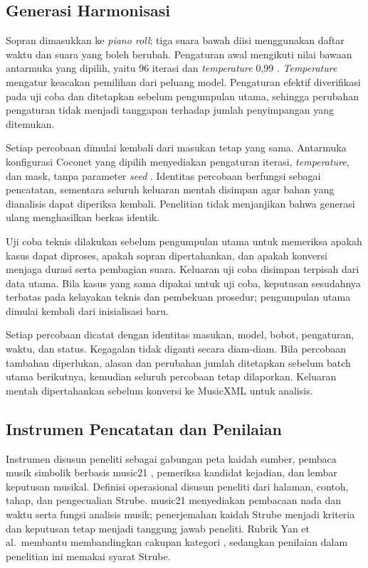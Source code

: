 \subsection{Generasi Harmonisasi}\label{sec:generasi-harmonisasi}

Sopran dimasukkan ke \textit{piano roll}; tiga suara bawah diisi menggunakan daftar waktu dan suara yang boleh berubah. Pengaturan awal mengikuti nilai bawaan antarmuka yang dipilih, yaitu 96 iterasi dan \textit{temperature} 0,99 \parencite{magentacoconet}. \textit{Temperature} mengatur keacakan pemilihan dari peluang model. Pengaturan efektif diverifikasi pada uji coba dan ditetapkan sebelum pengumpulan utama, sehingga perubahan pengaturan tidak menjadi tanggapan terhadap jumlah penyimpangan yang ditemukan.

Setiap percobaan dimulai kembali dari masukan tetap yang sama. Antarmuka konfigurasi Coconet yang dipilih menyediakan pengaturan iterasi, \textit{temperature}, dan mask, tanpa parameter \textit{seed} \parencite{magentacoconet}. Identitas percobaan berfungsi sebagai pencatatan, sementara seluruh keluaran mentah disimpan agar bahan yang dianalisis dapat diperiksa kembali. Penelitian tidak menjanjikan bahwa generasi ulang menghasilkan berkas identik.

Uji coba teknis dilakukan sebelum pengumpulan utama untuk memeriksa apakah kasus dapat diproses, apakah sopran dipertahankan, dan apakah konversi menjaga durasi serta pembagian suara. Keluaran uji coba disimpan terpisah dari data utama. Bila kasus yang sama dipakai untuk uji coba, keputusan sesudahnya terbatas pada kelayakan teknis dan pembekuan prosedur; pengumpulan utama dimulai kembali dari inisialisasi baru.

Setiap percobaan dicatat dengan identitas masukan, model, bobot, pengaturan, waktu, dan status. Kegagalan tidak diganti secara diam-diam. Bila percobaan tambahan diperlukan, alasan dan perubahan jumlah ditetapkan sebelum batch utama berikutnya, kemudian seluruh percobaan tetap dilaporkan. Keluaran mentah dipertahankan sebelum konversi ke MusicXML untuk analisis.

\subsection{Instrumen Pencatatan dan Penilaian}\label{sec:instrumen-pengukuran}

Instrumen disusun peneliti sebagai gabungan peta kaidah sumber, pembaca musik simbolik berbasis music21 \parencite{cuthbert2010}, pemeriksa kandidat kejadian, dan lembar keputusan musikal. Definisi operasional disusun peneliti dari halaman, contoh, tahap, dan pengecualian Strube. music21 menyediakan pembacaan nada dan waktu serta fungsi analisis musik; penerjemahan kaidah Strube menjadi kriteria dan keputusan tetap menjadi tanggung jawab peneliti. Rubrik Yan et al.\ membantu membandingkan cakupan kategori \parencite{yan2018}, sedangkan penilaian dalam penelitian ini memakai syarat Strube.

